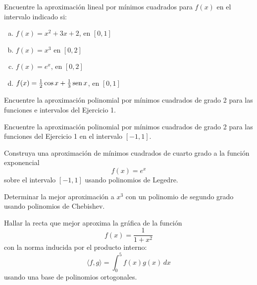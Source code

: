 \documentclass[11pt]{article}
\begin{document}
\begin{question} %
Encuentre la aproximación lineal por mínimos cuadrados para $f(x)$ en el intervalo indicado si:
\begin{enumerate}[a)]
    \item $f(x) = x^2 + 3 x + 2$, en $[0, 1]$
    \item $f(x) = x^3$ en $[0, 2]$
    \item $f(x) = e^x$, en $[0, 2]$
    \item $f(x) = \frac{1}{2} \cos x + \frac{1}{3} \operatorname{sen} x$, en $[0, 1]$
\end{enumerate}
\end{question}

\begin{question} %
    Encuentre la aproximación polinomial por mínimos cuadrados de grado 2 para las funciones e intervalos del Ejercicio 1.
\end{question}

\begin{question} %
    Encuentre la aproximación polinomial por mínimos cuadrados de grado 2 para las funciones del Ejercicio 1 en el intervalo $[-1, 1]$.
\end{question}

\begin{question} %
    Construya una aproximación de mínimos cuadrados de cuarto grado a la función exponencial
    \[ f(x) = e^x \]
    sobre el intervalo $[-1, 1]$ usando polinomios de Legedre.
\end{question}

\begin{question} %
Determinar la mejor aproximación a $x^3$ con un polinomio de segundo grado usando polinomios de Chebishev.
\end{question}


\begin{question} %
Hallar la recta que mejor aproxima la gráfica de la función 
\[ f(x) = \frac{1}{1 + x^2} \]
con la norma inducida por el producto interno:
\[ \langle f, g \rangle = \int_0^5 f(x) g(x) \, dx \] 
usando una base de polinomios ortogonales.
\end{question}
\end{document}
